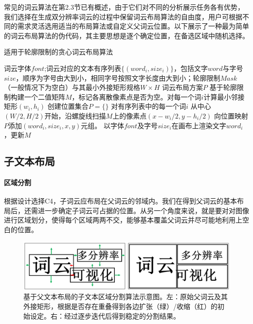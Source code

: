 常见的词云算法在第2.3节已有概述，由于它们对不同的分析展示任务各有优势，我们选择在生成双分辨率词云的过程中保留词云布局算法的自由度，用户可根据不同的需求灵活选用适当的布局算法或自定义父词云位置。以下展示了一种最为简单的词云布局算法的伪代码，其主要思想是逐个确定位置，在备选区域中随机选择。
 \begin{algorithm}[htb]
	\caption{适用于轮廓限制的贪心词云布局算法}
	\label{alg:basic_layout}
	\begin{algorithmic}[1]
		\Require
		词云字体$font$;词云对应的文本有序列表$\{(word_i, size_i)\}$，包括文字$word$与字号$size$，顺序为字号由大到小，相同字号按照文字长度由大到小；轮廓限制$Mask$（一般情况下为空白）与其最小外接矩形规格$W\times H$
		\Ensure
		词云布局方案$P$
		\State 基于轮廓限制构建一个二值矩阵$M$，标记各离散像素点是否为空。对每一个词$i$计算最小邻接矩形$(w_i, h_i)$
		\State 创建位置集合$P=\{\}$
		\Repeat 对有序列表中的每一个词$i$
			\Repeat 从中心$(W/2, H/2)$开始，沿螺旋线扫描$M$上的像素点$(x-w_i/2,y-h_i/2)$
			\State 向位置映射$P$添加$(word_i, size_i, x, y)$元组。
			\State 以字体$font$及字号$size_i$在画布上渲染文字$word_i$，更新$M$
			\EndIf

	\end{algorithmic}
\end{algorithm}

\subsection{子文本布局}

\paragraph{区域分割}
根据设计选择C4，子词云应布局在父词云的邻域内。我们在得到父词云的基本布局后，还需进一步确定子词云可占据的位置。从另一个角度来说，就是要对对图像进行区域划分，使得每个区域两两不交，能够基本覆盖父词云并尽可能地利用上空白的位置。


\begin{figure}[htbp]
	\centering
	\includegraphics[width=\textwidth]{figures/expand.png}
	\caption{基于父文本布局的子文本区域分割算法示意图。左：原始父词云及其外接矩形，根据是否存在重叠得到各边扩张（绿）/收缩（红）的初始设定。右：经过逐步迭代后得到稳定的分割结果。}
	\label{fig:expand_alg}
\end{figure}

